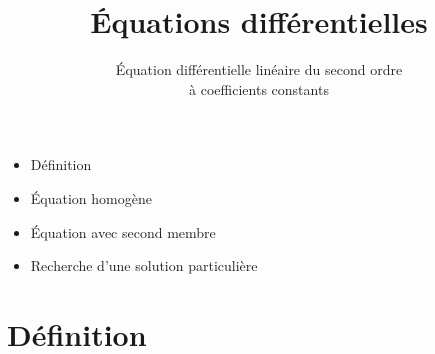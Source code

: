 







\title{{\bf \'Equations différentielles}}
\subtitle{\'Equation différentielle linéaire du second ordre\\ à coefficients constants}

\begin{frame}
  
  \debutmontitre

  \pause

{\footnotesize
\hfill
{}
\begin{minipage}{0.6\textwidth}
  \begin{itemize}
    \item<3-> Définition
    \item<4-> \'Equation homogène
    \item<5-> \'Equation avec second membre
    \item<6-> Recherche d'une solution particulière
  \end{itemize}
\end{minipage}
}

\end{frame}

\setcounter{framenumber}{0}

\section*{Définition}

